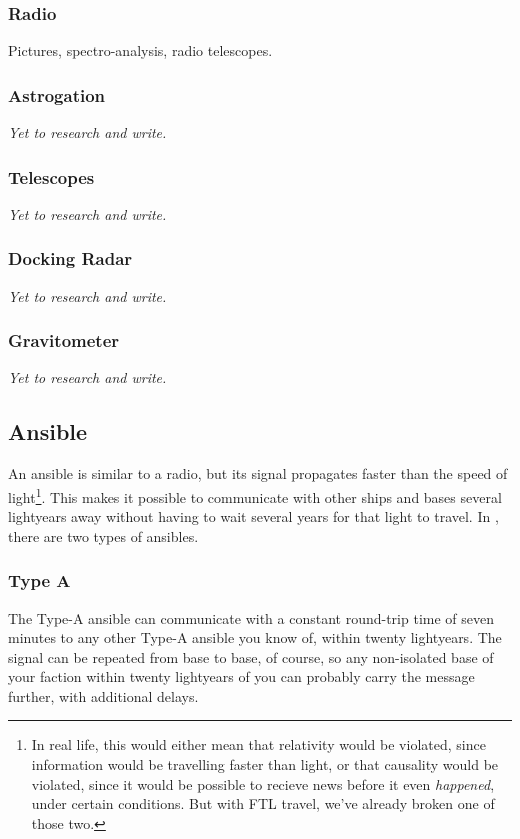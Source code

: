 \subsubsection{Radio}
Pictures, spectro-analysis, radio telescopes.

\subsubsection{Astrogation}

\textit{Yet to research and write.}

\subsubsection{Telescopes}

\textit{Yet to research and write.}

\subsubsection{Docking Radar}

\textit{Yet to research and write.}

\subsubsection{Gravitometer}

\textit{Yet to research and write.}

\subsection{Ansible}
\par
An ansible is similar to a radio, but its signal propagates faster than the speed of light\footnote{In real life, this would either mean that relativity would be violated, since information would be travelling faster than light, or that causality would be violated, since it would be possible to recieve news before it even \textit{happened}, under certain conditions. But with FTL travel, we've already broken one of those two.}. This makes it possible to communicate with other ships and bases several lightyears away without having to wait several years for that light to travel. In \getTitle, there are two types of ansibles.

\subsubsection{Type A}
\par
The Type-A ansible can communicate with a constant round-trip time of seven minutes to any other Type-A ansible you know of, within twenty lightyears. The signal can be repeated from base to base, of course, so any non-isolated base of your faction within twenty lightyears of you can probably carry the message further, with additional delays.

